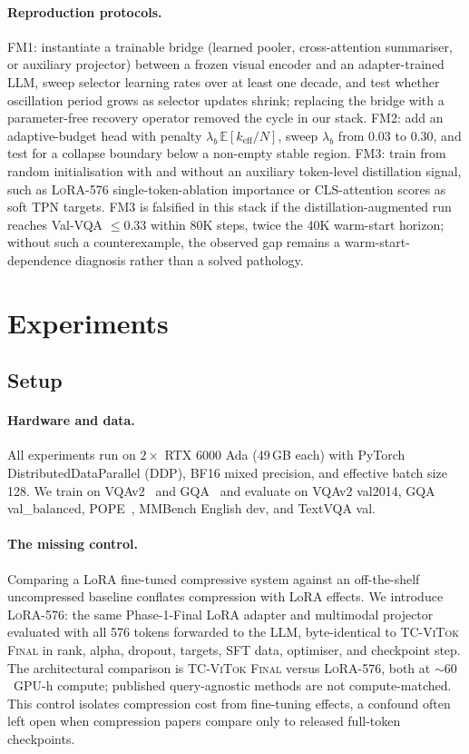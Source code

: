 \documentclass[runningheads]{llncs}
\newcommand{\keff}{k_{\mathrm{eff}}}
\newcommand{\lbb}{\lambda_b}
\begin{document}
\paragraph{Reproduction protocols.}
FM1: instantiate a trainable bridge (learned pooler, cross-attention
summariser, or auxiliary projector) between a frozen visual encoder and
an adapter-trained LLM, sweep selector learning rates over at least one
decade, and test whether oscillation period grows as selector updates
shrink; replacing the bridge with a parameter-free recovery operator
removed the cycle in our stack. FM2: add an adaptive-budget head with penalty
$\lbb\,\mathbb{E}[\keff/N]$, sweep $\lbb$ from $0.03$ to $0.30$, and
test for a collapse boundary below a non-empty stable region. FM3:
train from random initialisation with and without an auxiliary
token-level distillation signal, such as \textsc{LoRA-576}
single-token-ablation importance or CLS-attention scores as soft TPN
targets. FM3 is falsified in this stack if the distillation-augmented
run reaches Val-VQA $\leq 0.33$ within 80K steps, twice the 40K
warm-start horizon; without such a counterexample, the observed gap
remains a warm-start-dependence diagnosis rather than a solved pathology.

\section{Experiments}
\label{sec:experiments}

\subsection{Setup}

\paragraph{Hardware and data.}
All experiments run on $2{\times}$ RTX 6000 Ada (49\,GB each) with
PyTorch DistributedDataParallel (DDP), BF16 mixed precision, and
effective batch size 128. We train on
VQAv2~\cite{goyal2017vqav2} and GQA~\cite{hudson2019gqa} and evaluate on
VQAv2 val2014, GQA val\_balanced, POPE~\cite{li2023pope}, MMBench English
dev, and TextVQA val.

\paragraph{The missing control.}
Comparing a LoRA fine-tuned compressive system against an off-the-shelf
uncompressed baseline conflates compression with LoRA effects. We
introduce \textsc{LoRA-576}: the same Phase-1-Final LoRA adapter and
multimodal projector evaluated with all 576 tokens forwarded to the
LLM, byte-identical to \textsc{TC-ViTok Final} in rank, alpha,
dropout, targets, SFT data, optimiser, and checkpoint step. The
architectural comparison is \textsc{TC-ViTok Final} versus
\textsc{LoRA-576}, both at $\sim\!60$~GPU-h compute; published
query-agnostic methods are not compute-matched. This control isolates
compression cost from fine-tuning effects, a confound often left open
when compression papers compare only to released full-token checkpoints.
\end{document}
